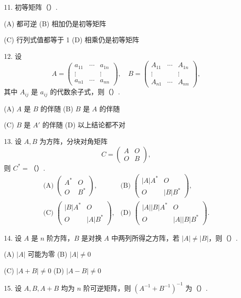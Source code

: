 \documentclass[UTF8,12pt,a4paper,fontset=fandol]{ctexart}
\begin{document}
11. 初等矩阵（\quad ）.

(A) 都可逆\qquad
(B) 相加仍是初等矩阵

(C) 行列式值都等于 1\qquad
(D) 相乘仍是初等矩阵

12. 设
\[
A=
\left(
\begin{array}{ccc}
a_{11} & \cdots & a_{1n}\\
\vdots & & \vdots\\
a_{n1} & \cdots & a_{nn}
\end{array}
\right),\quad
B=
\left(
\begin{array}{ccc}
A_{11} & \cdots & A_{1n}\\
\vdots & & \vdots\\
A_{n1} & \cdots & A_{nn}
\end{array}
\right),
\]
其中 $A_{ij}$ 是 $a_{ij}$ 的代数余子式，则（\quad ）.

(A) $A$ 是 $B$ 的伴随\qquad
(B) $B$ 是 $A$ 的伴随

(C) $B$ 是 $A'$ 的伴随\qquad
(D) 以上结论都不对

13. 设 $A,B$ 为方阵，分块对角矩阵
\[
C=
\left(
\begin{array}{cc}
A & O\\
O & B
\end{array}
\right),
\]
则 $C^*=$（\quad ）.
\[
\begin{array}{ll}
\text{(A) }\left(\begin{array}{cc}A^*&O\\O&B^*\end{array}\right),&
\text{(B) }\left(\begin{array}{cc}|A|A^*&O\\O&|B|B^*\end{array}\right),\\[1em]
\text{(C) }\left(\begin{array}{cc}|B|A^*&O\\O&|A|B^*\end{array}\right),&
\text{(D) }\left(\begin{array}{cc}|A||B|A^*&O\\O&|A||B|B^*\end{array}\right).
\end{array}
\]

14. 设 $A$ 是 $n$ 阶方阵，$B$ 是对换 $A$ 中两列所得之方阵，若 $|A|\ne|B|$，则（\quad ）.

(A) $|A|$ 可能为零\qquad
(B) $|A|\ne0$

(C) $|A+B|\ne0$\qquad
(D) $|A-B|\ne0$

15. 设 $A,B,A+B$ 均为 $n$ 阶可逆矩阵，则 $(A^{-1}+B^{-1})^{-1}$ 为（\quad ）.
\end{document}
